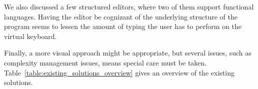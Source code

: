 We also discussed a few structured editors, where two of them support functional languages. 
Having the editor be cognizant of the underlying structure of the program seems to lessen the amount of typing the user has to perform on the virtual keyboard. 

Finally, a more visual approach might be appropriate, but several issues, such as complexity management issues, means special care must be taken.
Table~\ref{table:existing_solutions_overview} gives an overview of the existing solutions. 
